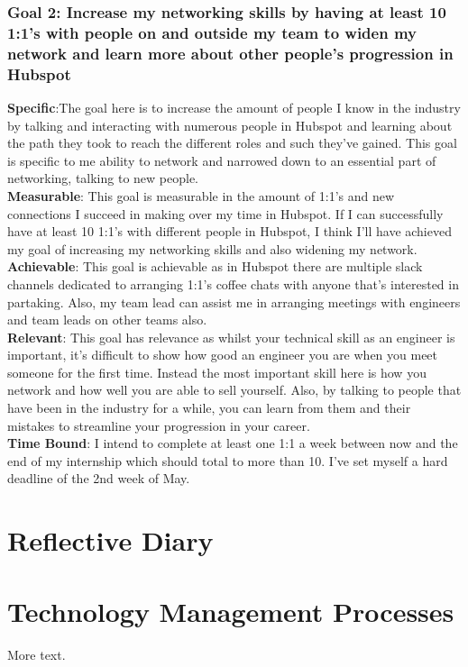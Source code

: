 \documentclass[11pt]{article} %
\begin{document}
\subsubsection{Goal 2: Increase my networking skills by having at least 10 1:1's with people on and outside my team to widen my network and learn more about other people's progression in Hubspot}
\textbf{Specific}:The goal here is to increase the amount of people I know in the industry by talking and interacting with numerous people in Hubspot and learning about the path they took to reach the different roles and such they've gained. This goal is specific to me ability to network and narrowed down to an essential part of networking,  talking to new people. 
\\ \textbf{Measurable}: This goal is measurable in the amount of 1:1's and new connections I succeed in making over my time in Hubspot.  If I can successfully have at least 10 1:1's with different people in Hubspot,  I think I'll have achieved my goal of increasing my networking skills and also widening my network.
\\ \textbf{Achievable}: This goal is achievable as in Hubspot there are multiple slack channels dedicated to arranging 1:1's coffee chats with anyone that's interested in partaking.  Also,  my team lead can assist me in arranging meetings with engineers and team leads on other teams also.
\\ \textbf{Relevant}: This goal has relevance as whilst your technical skill as an engineer is important,  it's difficult to show how good an engineer you are when you meet someone for the first time.  Instead the most important skill here is how you network and how well you are able to sell yourself.  Also, by talking to people that have been in the industry for a while,  you can learn from them and their mistakes to streamline your progression in your career. 
\\ \textbf{Time Bound}: I intend to complete at least one 1:1  a week between now and the end of my internship which should total to more than 10.  I've set myself a hard deadline of the 2nd week of May. 
\section{Reflective Diary}
\section{Technology Management Processes}
More text.
\end{document}

